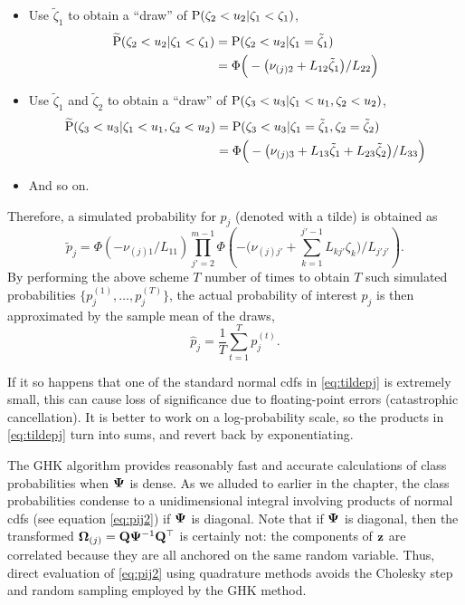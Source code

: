 \begin{itemize}
  \item Use $\tilde\zeta_1$ to obtain a ``draw'' of $\operatorname{P}(\zeta_2 < u_2|\zeta_1 < \zeta_1)$,
  \begin{align*}
    \widetilde{\operatorname{P}}(\zeta_2 < u_2|\zeta_1 < \zeta_1)
    &=\operatorname{P}(\zeta_2 < u_2|\zeta_1 = \tilde\zeta_1) \\
    &= \Phi \Big( - \big(\nu_{(j)2} +  L_{12}\tilde\zeta_1 \big) / L_{22} \Big)
  \end{align*}
  \item Use $\tilde\zeta_1$ and $\tilde\zeta_2$ to obtain a ``draw'' of $\operatorname{P}(\zeta_3 < u_3|\zeta_1 < u_1,\zeta_2 < u_2)$,
  \begin{align*}
    \widetilde{\operatorname{P}}(\zeta_3 < u_3|\zeta_1 < u_1,\zeta_2 < u_2)
    &=\operatorname{P}(\zeta_3 < u_3|\zeta_1 = \tilde\zeta_1,\zeta_2 = \tilde\zeta_2)\\
    &= \Phi \Big( - \big(\nu_{(j)3} + L_{13}\tilde\zeta_1 + L_{23}\tilde\zeta_2 \big) / L_{33} \Big)
  \end{align*} 
  \item And so on. 
\end{itemize}
Therefore, a simulated probability for $p_j$ (denoted with a tilde) is obtained as
\begin{equation}\label{eq:tildepj}
  \tilde p_j = \Phi\left( -\nu_{(j)1}/ L_{11} \right) 
  \prod_{j'=2}^{m-1} \Phi \left( 
  - \big(\nu_{(j)j'} + \textstyle\sum_{k=1}^{j'-1} L_{kj'}\zeta_k \big) / L_{j'j'} 
  \right).
\end{equation}
By performing the above scheme $T$ number of times to obtain $T$ such simulated probabilities $\{p_j^{(1)},\dots,p_j^{(T)} \}$, the actual probability of interest $p_j$ is then approximated by the sample mean of the draws,
\[
  \hat p_j = \frac{1}{T} \sum_{t=1}^T p_j^{(t)}.
\]

If it so happens that one of the standard normal cdfs in \cref{eq:tildepj} is extremely small, this can cause loss of significance due to floating-point errors (catastrophic cancellation).
It is better to work on a log-probability scale, so the products in \cref{eq:tildepj} turn into sums, and revert back by exponentiating.

\begin{remark}
  The GHK algorithm provides reasonably fast and accurate calculations of class probabilities when ${\bm\Psi}$ is dense.
  As we alluded to earlier in the chapter, the class probabilities condense to a unidimensional integral involving products of normal cdfs (see equation \ref{eq:pij2}) if ${\bm\Psi}$ is diagonal.
  Note that if ${\bm\Psi}$ is diagonal, then the transformed ${\bm\Omega}_{(j)} = {\mathbf Q}{\bm\Psi}^{-1}{\mathbf Q}^\top$ is certainly not: the components of ${\mathbf z}$ are correlated because they are all anchored on the same random variable.
  Thus, direct evaluation of \cref{eq:pij2} using quadrature methods avoids the Cholesky step and random sampling employed by the GHK method.
\end{remark}

